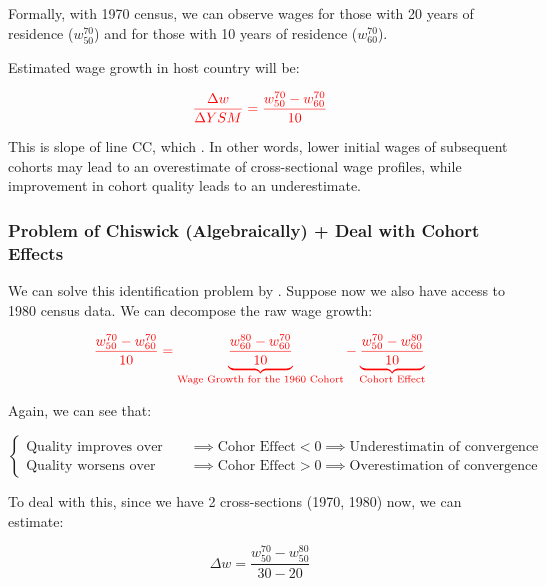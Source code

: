             Formally, with 1970 census, we can observe wages for those with 20 years of residence ($w_{50}^{70}$) and for those with 10 years of residence ($w_{60}^{70}$).
            
            Estimated wage growth in host country will be:
            
            \[\color{red} \frac{\Delta w}{\Delta YSM} = \frac{w_{50}^{70}-w_{60}^{70}}{10}\]
            
            This is slope of line CC, which . In other words, lower initial wages of subsequent cohorts may lead to an overestimate of cross-sectional wage profiles, while improvement in cohort quality leads to an underestimate.

        \subsubsection{Problem of Chiswick (Algebraically) + Deal with Cohort Effects}

            We can solve this identification problem by . Suppose now we also have access to 1980 census data. We can decompose the raw wage growth:

            \begin{equation*}
                \color{red}
                \frac{w_{50}^{70} - w_{60}^{70}}{10} = \underbrace{\frac{w_{60}^{80} - w_{60}^{70}}{10}}_{\text{Wage Growth for the 1960 Cohort}} - \underbrace{\frac{w_{50}^{70} - w_{60}^{80}}{10}}_{\text{Cohort Effect}}
            \end{equation*}

            Again, we can see that:

            $$\begin{cases}
                \text{Quality improves over time} & \implies \text{Cohor Effect}<0\implies \text{Underestimatin of convergence} \\
                \text{Quality worsens over time} & \implies \text{Cohor Effect}>0\implies \text{Overestimation of convergence}
            \end{cases}$$

            To deal with this, since we have 2 cross-sections (1970, 1980) now, we can estimate:

            $$
            \Delta w=\frac{w_{50}^{70}-w_{50}^{80}}{30-20}
            $$


